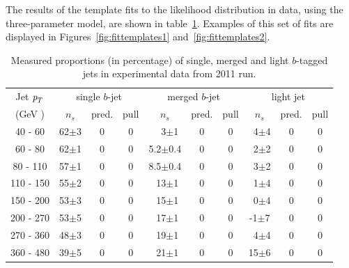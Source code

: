 The results of the template fits to the likelihood distribution in data, using the three-parameter model, are shown in table~\ref{tb:fitfractions}. Examples of this set of fits are displayed in Figures~\ref{fig:fittemplates1} and~\ref{fig:fittemplates2}.


\begin{table}[!hbt] %
\renewcommand{\arraystretch}{1.2}
\centering
\begin{tabular}{ | c || c | c | c || c | c | c || c | c | c ||}
  \hline
  Jet ${\emph{p}_{T}}$ & \multicolumn{3}{c||}{single $b$-jet} & \multicolumn{3}{c||}{merged $b$-jet} & \multicolumn{3}{c||}{~light jet~}\\ \cline{2-10}
    (GeV ) & $n_s$ & pred.& pull & $n_s$ & pred.& pull & $n_s$ & pred.& pull \\ \hline
   40 - 60 &  62$\pm$3 & 0 & 0 &  ~~3$\pm$1   & 0 & 0 &  ~4$\pm$4  & 0 & 0\\ 
   60 - 80 &  62$\pm$1 & 0 & 0 &  5.2$\pm$0.4 & 0 & 0 &  ~2$\pm$2  & 0 & 0\\ 
   80 - 110&  57$\pm$1 & 0 & 0 &  8.5$\pm$0.4 & 0 & 0 &  ~3$\pm$2  & 0 & 0\\ 
  110 - 150&  55$\pm$2 & 0 & 0 &  ~13$\pm$1   & 0 & 0 &  ~1$\pm$4  & 0 & 0\\ 
  150 - 200&  53$\pm$3 & 0 & 0 &  ~15$\pm$1   & 0 & 0 &  ~0$\pm$4  & 0 & 0\\ 
  200 - 270&  53$\pm$5 & 0 & 0 &  ~17$\pm$1   & 0 & 0 &  -1$\pm$7  & 0 & 0\\ 
  270 - 360&  48$\pm$3 & 0 & 0 &  ~19$\pm$1   & 0 & 0 &  ~4$\pm$4  & 0 & 0\\ 
  360 - 480&  39$\pm$5 & 0 & 0 &  ~21$\pm$1   & 0 & 0 &  15$\pm$6  & 0 & 0\\ \hline
\end{tabular}
\caption{Measured proportions (in percentage) of single, merged and light $b$-tagged jets in experimental data from 2011 run.}
\label{tb:fitfractions}
\end{table}


